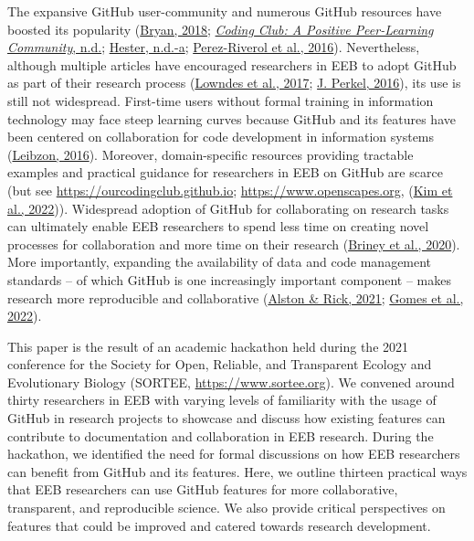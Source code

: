 The expansive GitHub user-community and numerous GitHub resources have boosted its popularity (\protect\hyperlink{ref-RVetqmsg}{Bryan, 2018}; \protect\hyperlink{ref-u5aEVE4B}{\emph{Coding Club: A Positive Peer-Learning Community}, n.d.}; \protect\hyperlink{ref-13jOlVcpp}{Hester, n.d.-a}; \protect\hyperlink{ref-kEX5dgzK}{Perez-Riverol et al., 2016}).
Nevertheless, although multiple articles have encouraged researchers in EEB to adopt GitHub as part of their research process (\protect\hyperlink{ref-3DKwn1sY}{Lowndes et al., 2017}; \protect\hyperlink{ref-10ghgV3S8}{J. Perkel, 2016}), its use is still not widespread.
First-time users without formal training in information technology may face steep learning curves because GitHub and its features have been centered on collaboration for code development in information systems (\protect\hyperlink{ref-139b0pSGc}{Leibzon, 2016}).
Moreover, domain-specific resources providing tractable examples and practical guidance for researchers in EEB on GitHub are scarce (but see \url{https://ourcodingclub.github.io}; \url{https://www.openscapes.org}, (\protect\hyperlink{ref-lJAgyhYq}{Kim et al., 2022})).
Widespread adoption of GitHub for collaborating on research tasks can ultimately enable EEB researchers to spend less time on creating novel processes for collaboration and more time on their research (\protect\hyperlink{ref-ydrk01SR}{Briney et al., 2020}).
More importantly, expanding the availability of data and code management standards -- of which GitHub is one increasingly important component -- makes research more reproducible and collaborative (\protect\hyperlink{ref-13QX8XU3J}{Alston \& Rick, 2021}; \protect\hyperlink{ref-pq2Tv1BC}{Gomes et al., 2022}).

This paper is the result of an academic hackathon held during the 2021 conference for the Society for Open, Reliable, and Transparent Ecology and Evolutionary Biology (SORTEE, \url{https://www.sortee.org}).
We convened around thirty researchers in EEB with varying levels of familiarity with the usage of GitHub in research projects to showcase and discuss how existing features can contribute to documentation and collaboration in EEB research.
During the hackathon, we identified the need for formal discussions on how EEB researchers can benefit from GitHub and its features.
Here, we outline thirteen practical ways that EEB researchers can use GitHub features for more collaborative, transparent, and reproducible science.
We also provide critical perspectives on features that could be improved and catered towards research development.

